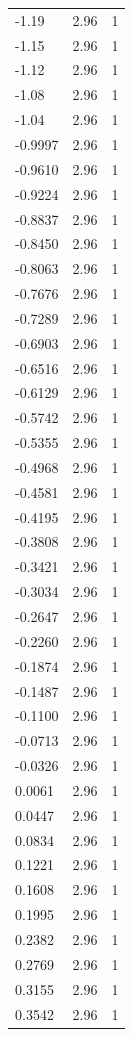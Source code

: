 \begin{longtable}{lrr}
  -1.19 & 2.96 & 1 \\
  -1.15 & 2.96 & 1 \\
  -1.12 & 2.96 & 1 \\
  -1.08 & 2.96 & 1 \\
  -1.04 & 2.96 & 1 \\
  -0.9997 & 2.96 & 1 \\
  -0.9610 & 2.96 & 1 \\
  -0.9224 & 2.96 & 1 \\
  -0.8837 & 2.96 & 1 \\
  -0.8450 & 2.96 & 1 \\
  -0.8063 & 2.96 & 1 \\
  -0.7676 & 2.96 & 1 \\
  -0.7289 & 2.96 & 1 \\
  -0.6903 & 2.96 & 1 \\
  -0.6516 & 2.96 & 1 \\
  -0.6129 & 2.96 & 1 \\
  -0.5742 & 2.96 & 1 \\
  -0.5355 & 2.96 & 1 \\
  -0.4968 & 2.96 & 1 \\
  -0.4581 & 2.96 & 1 \\
  -0.4195 & 2.96 & 1 \\
  -0.3808 & 2.96 & 1 \\
  -0.3421 & 2.96 & 1 \\
  -0.3034 & 2.96 & 1 \\
  -0.2647 & 2.96 & 1 \\
  -0.2260 & 2.96 & 1 \\
  -0.1874 & 2.96 & 1 \\
  -0.1487 & 2.96 & 1 \\
  -0.1100 & 2.96 & 1 \\
  -0.0713 & 2.96 & 1 \\
  -0.0326 & 2.96 & 1 \\
  0.0061 & 2.96 & 1 \\
  0.0447 & 2.96 & 1 \\
  0.0834 & 2.96 & 1 \\
  0.1221 & 2.96 & 1 \\
  0.1608 & 2.96 & 1 \\
  0.1995 & 2.96 & 1 \\
  0.2382 & 2.96 & 1 \\
  0.2769 & 2.96 & 1 \\
  0.3155 & 2.96 & 1 \\
  0.3542 & 2.96 & 1 \\

\end{longtable}
